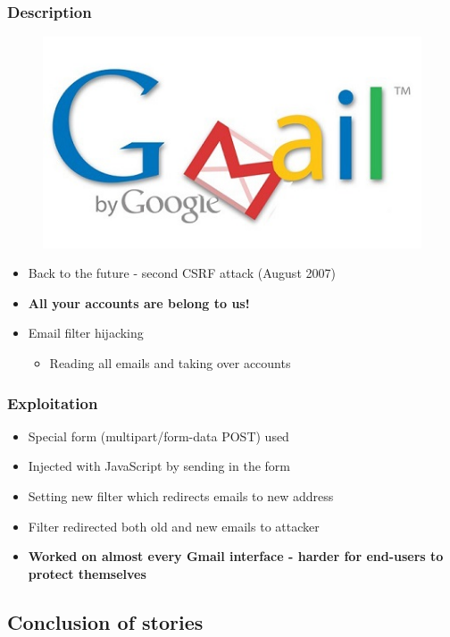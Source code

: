 \documentclass[svgnames]{beamer}
\begin{document}
\begin{frame}
  \frametitle{Description}
  
  \begin{figure}
    \includegraphics[width=.6\textwidth]{media/gmail_logo_0.jpg}
  \end{figure}	  
  
  \begin{itemize}
    \item Back to the future - second CSRF attack (August 2007)
    \pause
    \item \textbf{All your accounts are belong to us!}
    \item Email filter hijacking
    \begin{itemize}
      \item Reading all emails and taking over accounts
    \end{itemize}
  \end{itemize}
\end{frame}

\begin{frame}
  \frametitle{Exploitation}
  \begin{itemize}
    \item Special form (multipart/form-data POST) used
    \item Injected with JavaScript by sending in the form
    \pause
    \item Setting new filter which redirects emails to new address
    \item Filter redirected both old and new emails to attacker
    \pause
    \item \textbf{Worked on almost every Gmail interface - harder for end-users to protect themselves}
  \end{itemize}
\end{frame}

\subsection{Conclusion of stories}
\end{document}
